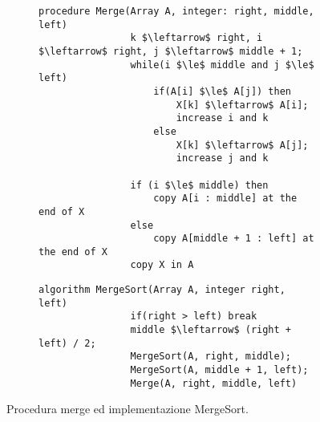 \documentclass{subfiles}
\begin{document}
\begin{figure*}[!h]
    \centering
    \begin{subfigure}[b]{0.65\textwidth}
        \begin{lstlisting}[language = algol]
            procedure Merge(Array A, integer: right, middle, left)
                k $\leftarrow$ right, i $\leftarrow$ right, j $\leftarrow$ middle + 1;
                while(i $\le$ middle and j $\le$ left)
                    if(A[i] $\le$ A[j]) then
                        X[k] $\leftarrow$ A[i];
                        increase i and k
                    else 
                        X[k] $\leftarrow$ A[j];
                        increase j and k

                if (i $\le$ middle) then
                    copy A[i : middle] at the end of X
                else
                    copy A[middle + 1 : left] at the end of X
                copy X in A
        \end{lstlisting}
    \end{subfigure}
    \begin{subfigure}[b]{0.65\textwidth}
        \begin{lstlisting}[language = algol]
            algorithm MergeSort(Array A, integer right, left)
                if(right > left) break
                middle $\leftarrow$ (right + left) / 2;
                MergeSort(A, right, middle);
                MergeSort(A, middle + 1, left);
                Merge(A, right, middle, left)
        \end{lstlisting}
    \end{subfigure}
    \caption{Procedura merge ed implementazione MergeSort.}
\end{figure*}
\end{document}
